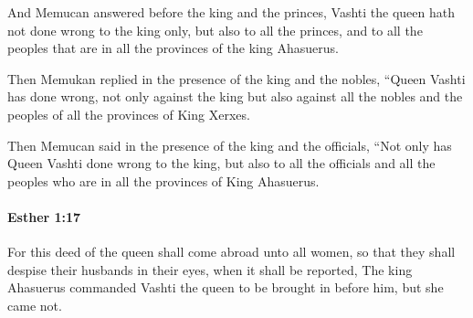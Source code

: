 			\begin{versebox}
					\item[BHS] 
					\item[LXX] 
					\item[ASV] And Memucan answered before the king and the princes, Vashti the queen hath not done wrong to the king only, but also to all the princes, and to all the peoples that are in all the provinces of the king Ahasuerus.
					\item[NIV] Then Memukan replied in the presence of the king and the nobles, “Queen Vashti has done wrong, not only against the king but also against all the nobles and the peoples of all the provinces of King Xerxes.
					\item[NRSV] Then Memucan said in the presence of the king and the officials, “Not only has Queen Vashti done wrong to the king, but also to all the officials and all the peoples who are in all the provinces of King Ahasuerus.
			\end{versebox}

		\paragraph{Esther 1:17} %
			\label{ESTHER-1-17}

			For this deed of the queen shall come abroad unto all women, so that they shall despise their husbands in their eyes, when it shall be reported, The king Ahasuerus commanded Vashti the queen to be brought in before him, but she came not.

